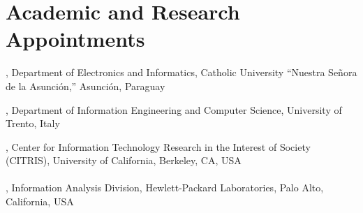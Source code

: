 
\section{Academic and Research Appointments}

, Department of Electronics and Informatics, Catholic University ``Nuestra Señora de la Asunción,'' Asunción, Paraguay 

, Department of Information Engineering and Computer Science, University of Trento, Italy 

, Center for Information Technology Research in the Interest of Society (CITRIS), University of California, Berkeley, CA, USA \\\\
, Information Analysis Division, Hewlett-Packard Laboratories, Palo Alto, California, USA 

